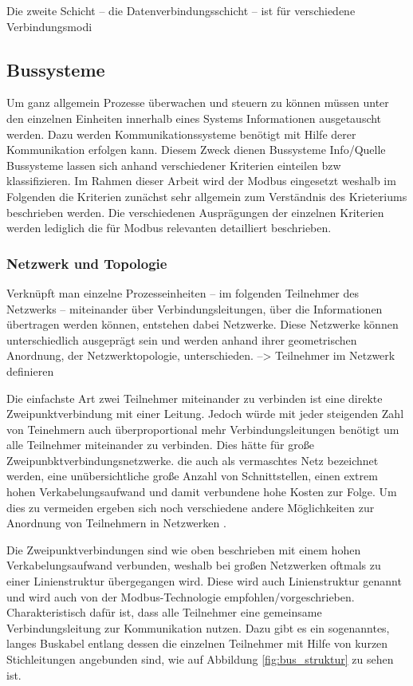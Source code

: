 Die zweite Schicht -- die Datenverbindungsschicht -- ist für verschiedene Verbindungsmodi 



\subsection{Bussysteme} 
Um ganz allgemein Prozesse überwachen und steuern zu können müssen unter den einzelnen Einheiten innerhalb eines Systems Informationen ausgetauscht werden. Dazu werden Kommunikationssysteme benötigt mit Hilfe derer Kommunikation erfolgen kann. Diesem Zweck dienen Bussysteme
Info/Quelle 
Bussysteme lassen sich anhand verschiedener Kriterien einteilen bzw klassifizieren. Im Rahmen dieser Arbeit wird der Modbus eingesetzt weshalb im Folgenden die Kriterien zunächst sehr allgemein zum Verständnis des Krieteriums beschrieben werden. Die verschiedenen Ausprägungen der einzelnen Kriterien werden lediglich die für Modbus relevanten detailliert beschrieben.

\subsubsection{Netzwerk und Topologie}
Verknüpft man einzelne Prozesseinheiten -- im folgenden Teilnehmer des Netzwerks -- miteinander über Verbindungsleitungen, über die Informationen übertragen werden können, entstehen dabei Netzwerke. Diese Netzwerke können unterschiedlich ausgeprägt sein und werden anhand ihrer geometrischen Anordnung, der Netzwerktopologie, unterschieden.
--> Teilnehmer im Netzwerk definieren

Die einfachste Art zwei Teilnehmer miteinander zu verbinden ist eine direkte Zweipunktverbindung mit einer Leitung. Jedoch würde mit jeder steigenden Zahl von Teinehmern auch überproportional mehr Verbindungsleitungen benötigt um alle Teilnehmer miteinander zu verbinden. Dies hätte für große Zweipunbktverbindungsnetzwerke. die auch als vermaschtes Netz bezeichnet werden, eine unübersichtliche große Anzahl von Schnittstellen, einen extrem hohen Verkabelungsaufwand und damit verbundene hohe Kosten zur Folge. Um dies zu vermeiden ergeben sich noch verschiedene andere Möglichkeiten zur Anordnung von Teilnehmern in Netzwerken \cite[S.~1f.]{schn06}.

Die Zweipunktverbindungen sind wie oben beschrieben mit einem hohen Verkabelungsaufwand verbunden, weshalb bei großen Netzwerken oftmals zu einer Linienstruktur übergegangen wird. Diese wird auch Linienstruktur genannt und wird auch von der Modbus-Technologie empfohlen/vorgeschrieben. Charakteristisch dafür ist, dass alle Teilnehmer eine gemeinsame Verbindungsleitung zur Kommunikation nutzen. Dazu gibt es ein sogenanntes, langes Buskabel entlang dessen die einzelnen Teilnehmer mit Hilfe von kurzen Stichleitungen angebunden sind, wie auf Abbildung \ref{fig:bus_struktur} zu sehen ist.

